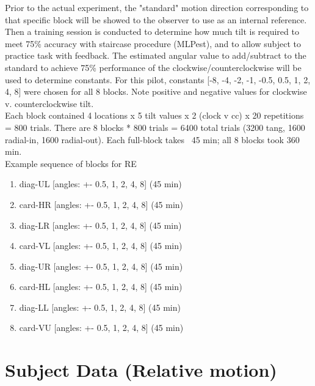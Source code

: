 \documentclass[11pt]{article} %
\begin{document}
Prior to the actual experiment, the "standard" motion direction corresponding to that specific block will be showed to the observer to use as an internal reference. Then a training session is conducted to determine how much tilt is required to meet 75\% accuracy with staircase procedure (MLPest), and to allow subject to practice task with feedback. The estimated angular value to add/subtract to the standard to achieve 75\% performance of the clockwise/counterclockwise will be used to determine constants. For this pilot, constants [-8, -4, -2, -1, -0.5, 0.5, 1, 2, 4, 8] were chosen for all 8 blocks. Note positive and negative values for clockwise v. counterclockwise tilt.
\\
Each block contained 4 locations x 5 tilt values x 2 (clock v cc) x 20 repetitions = 800 trials. There are 8 blocks * 800 trials = 6400 total trials (3200 tang, 1600 radial-in, 1600 radial-out). Each full-block takes ~45 min; all 8 blocks took 360 min. 
\\
Example sequence of blocks for RE
\begin{enumerate}
\item diag-UL [angles: +- 0.5, 1, 2, 4, 8] (45 min)
\item card-HR [angles: +- 0.5, 1, 2, 4, 8] (45 min)
\item diag-LR [angles: +- 0.5, 1, 2, 4, 8] (45 min)
\item card-VL [angles: +- 0.5, 1, 2, 4, 8] (45 min)
\item diag-UR [angles: +- 0.5, 1, 2, 4, 8] (45 min)
\item card-HL [angles: +- 0.5, 1, 2, 4, 8] (45 min)
\item diag-LL [angles: +- 0.5, 1, 2, 4, 8] (45 min)
\item card-VU [angles: +- 0.5, 1, 2, 4, 8] (45 min)
\end{enumerate}

\newpage
\section{Subject Data (Relative motion)}
\end{document}
